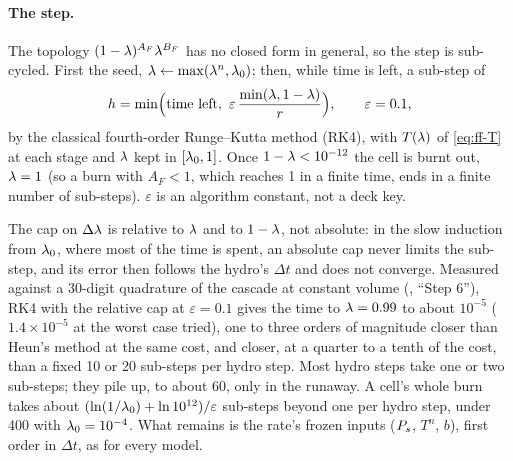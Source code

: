\paragraph{The step.} The topology $(1 - \lambda)^{A_F}\lambda^{B_F}$ has no closed
form in general, so the step is sub-cycled. First the seed, $\lambda \leftarrow
\max(\lambda^n, \lambda_0)$; then, while time is left, a sub-step of
\begin{equation}
  h = \min\Bigl(\text{time left},\ \varepsilon\,\frac{\min(\lam, 1 - \lam)}{r}\Bigr),
  \qquad \varepsilon = 0.1,
  \label{eq:ff-h}
\end{equation}
by the classical fourth-order Runge--Kutta method (RK4), with $T(\lambda)$ of
\cref{eq:ff-T} at each stage and $\lambda$ kept in $[\lambda_0, 1]$. Once $1 -
\lambda < 10^{-12}$ the cell is burnt out, $\lambda = 1$ (so a burn with $A_F < 1$,
which reaches 1 in a finite time, ends in a finite number of sub-steps).
$\varepsilon$ is an algorithm constant, not a deck key.

The cap on $\Delta\lambda$ is relative to $\lambda$ and to $1 - \lambda$, not absolute:
in the slow induction from $\lambda_0$, where most of the time is spent, an
absolute cap never limits the sub-step, and its error then follows the hydro's
$\Delta t$ and does not converge. Measured against a 30-digit quadrature of
the cascade at constant volume (, ``Step 6''),
RK4 with the relative cap at $\varepsilon = 0.1$ gives the time to $\lambda =
0.99$ to about $10^{-5}$ ($1.4\times10^{-5}$ at the worst case tried), one to
three orders of magnitude closer
than Heun's method at the same cost, and closer, at a quarter to a tenth of
the cost, than a fixed 10 or 20 sub-steps per hydro step. Most hydro steps
take one or two sub-steps; they pile up, to about 60, only in the runaway. A
cell's whole burn takes about $(\ln(1/\lambda_0) + \ln 10^{12})/\varepsilon$
sub-steps beyond one per hydro step, under 400 with $\lambda_0 = 10^{-4}$. What
remains is the rate's frozen inputs ($P_{s}$, $T^n$, $b$), first order in
$\Delta t$, as for every model.

